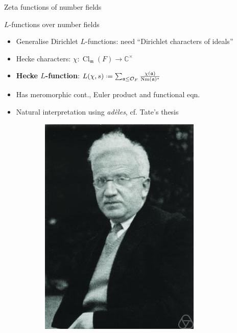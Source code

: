 \documentclass[10pt]{beamer}
\let\mf\mathfrak
\newcommand{\C}{\mathbb{C}}
\renewcommand{\O}{\mathcal{O}}
\newcommand*{\defeq}{\mathrel{\vcenter{\baselineskip0.5ex \lineskiplimit0pt
      \hbox{\scriptsize.}\hbox{\scriptsize.}}}%
  =}
\DeclareMathOperator{\Nm}{Nm}
\DeclareMathOperator{\Cl}{Cl}
\begin{document}
\begin{frame}{Zeta functions of number fields}
\begin{figure}[H]
\begin{subfigure}[b]{0.3\textwidth}
\end{subfigure}
\end{figure}\vspace{-5pt}

\end{frame}

\begin{frame}{$L$-functions over number fields}
  \begin{itemize}
  \item Generalise Dirichlet $L$-functions: need ``Dirichlet
    characters of ideals''\pause
  \item Hecke characters: $\chi \colon \Cl_{\mf m}(F)\to\C^{\times}$\pause
  \item \textbf{Hecke $L$-function}: $L(\chi,s) \defeq \sum_{\mf a \leq
      \O_{F}}\frac{\chi(\mf a)}{\Nm(\mf a)^{s}}$\pause
  \item Has meromorphic cont., Euler product and functional eqn.\pause
  \item Natural interpretation using \emph{adèles}, cf. Tate's thesis\pause
  \end{itemize}
    \begin{figure}[H]
  \centering
  \begin{subfigure}[b]{0.3\textwidth}
  \centering
\includegraphics[width=.6\textwidth]{Hecke.jpg}
\end{subfigure}
  \begin{subfigure}[b]{0.3\textwidth}
  \centering

\end{subfigure}
\end{figure}
\end{frame}
\end{document}
